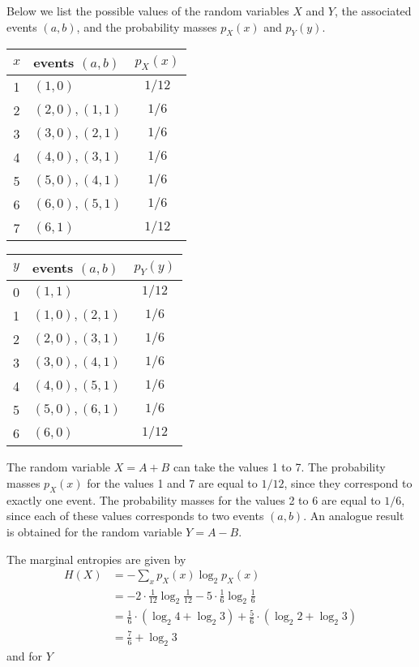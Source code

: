 \documentclass[a4paper]{article}
\begin{document}
{\begin{enumerate}
{Below we list the possible values of the random variables $X$ and $Y$, the associated events $(a,b)$, and the probability masses $p_X (x)$ and $p_Y(y).$
\begin{center}
\begin{tabular}{clc}
\hline
$x$ & events $(a,b)$ & $p_X(x)$ \\
\hline
1   & $(1,0)$ & $1/12$ \\
2   & $(2,0), (1,1)$ & $1/6$\\
3   & $(3,0), (2,1)$ & $1/6$\\
4   & $(4,0), (3,1)$ & $1/6$\\
5   & $(5,0), (4,1)$ & $1/6$\\
6   & $(6,0), (5,1)$ & $1/6$\\
7   & $(6,1)$ & $1/12$\\
\hline
\end{tabular}
\quad \quad
\begin{tabular}{clc}
\hline
$y$ & events $(a,b)$ & $p_Y(y)$ \\
\hline
0 & $(1,1)$ & $1/12$\\
1 & $(1,0), (2,1)$ & $1/6$\\
2 & $(2,0), (3,1)$ & $1/6$\\
3 & $(3,0), (4,1)$ & $1/6$\\
4 & $(4,0), (5,1)$ & $1/6$\\
5 & $(5,0), (6,1)$ & $1/6$\\
6 & $(6,0)$ & $1/12$\\
\hline
\end{tabular}
\end{center}

The random variable $X = A + B$ can take the values 1 to 7. The probability masses $p_X(x)$ for the values 1 and 7 are equal to $1/12$, since they correspond to exactly one event. The probability masses for the values 2 to 6 are equal to $1/6$, since each of these values corresponds to two events $(a,b)$. An analogue result is obtained for the random variable $Y =  A-B$.

The marginal entropies are given by
\begin{align*}
H(X) &= -\sum_x p_X(x) \log_2 p_X(x) \\
 &= -2\cdot \frac{1}{12}\log_2 \frac{1}{12} - 5\cdot \frac{1}{6}\log_2 \frac{1}{6} \\
 &= \frac{1}{6}\cdot\left( \log_2 4 + \log_2 3 \right) + \frac{5}{6}\cdot \left( \log_2 2 + \log_2 3 \right) \\
 &= \frac{7}{6} + \log_2 3
\end{align*}
and for $Y$

}
\end{enumerate}}
\end{document}
